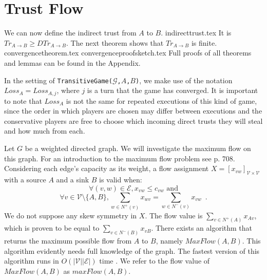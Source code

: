 \section{Trust Flow}
  We can now define the indirect trust from $A$ to $B$.
  {indirecttrust.tex}
  \noindent It is $Tr_{A \rightarrow B} \geq DTr_{A \rightarrow B}$. The next theorem shows that
  $Tr_{A \rightarrow B}$ is finite.
  {convergencetheorem.tex}
  {convergenceproofsketch.tex}
  Full proofs of all theorems and lemmas can be found in the Appendix.

  In the setting of \texttt{TransitiveGame(}$\mathcal{G}$\texttt{,}$A$\texttt{,}$B$\texttt{)}, we make use of the notation
  $Loss_A = Loss_{A, j}$, where $j$ is a turn that the game has converged. It is important to note that $Loss_A$ is
  not the same for repeated executions of this kind of game, since the order in which players are chosen may differ between
  executions and the conservative players are free to choose which incoming direct trusts they will steal and how much from
  each.

  Let $G$ be a weighted directed graph. We will investigate the maximum flow on this graph. For an introduction to the
  maximum flow problem see \cite{clrs} p. 708. Considering each edge's capacity as its weight, a flow assignment
  $X = [x_{vw}]_{\mathcal{V} \times \mathcal{V}}$ with a source $A$ and a sink $B$ is valid when:
  \begin{equation}
  \label{flow1}
    \forall (v, w) \in \mathcal{E}, x_{vw} \leq c_{vw} \mbox{ and}
  \end{equation}
  \begin{equation}
  \label{flow2}
    \forall v \in \mathcal{V} \setminus \{A,B\}, \sum\limits_{w \in N^{+}(v)}x_{wv} = \sum\limits_{w \in N^{-}(v)}x_{vw}
    \enspace.
  \end{equation}
  We do not suppose any skew symmetry in $X$. The flow value is $\sum\limits_{v \in N^{+}\left(A\right)}x_{Av}$, which is
  proven to be equal to $\sum\limits_{v \in N^{-}\left(B\right)}x_{vB}$. There exists an algorithm that returns the maximum
  possible flow from $A$ to $B$, namely $MaxFlow\left(A, B\right)$. This algorithm evidently needs full knowledge of the
  graph. The fastest version of this algorithm runs in $O\left(|\mathcal{V}||\mathcal{E}|\right)$ time \cite{maxflownm}. We
  refer to the flow value of $MaxFlow\left(A, B\right)$ as $maxFlow\left(A, B\right)$.

